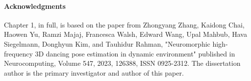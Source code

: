 \paragraph{Acknowledgments}

Chapter 1, in full, is based on the paper from Zhongyang Zhang, Kaidong Chai, Haowen Yu, Ramzi Majaj, Francesca Walsh, Edward Wang, Upal Mahbub, Hava Siegelmann, Donghyun Kim, and Tauhidur Rahman, "Neuromorphic high-frequency 3D dancing pose estimation in dynamic environment" published in Neurocomputing, Volume 547, 2023, 126388, ISSN 0925-2312. The dissertation author is the primary investigator and author of this paper.